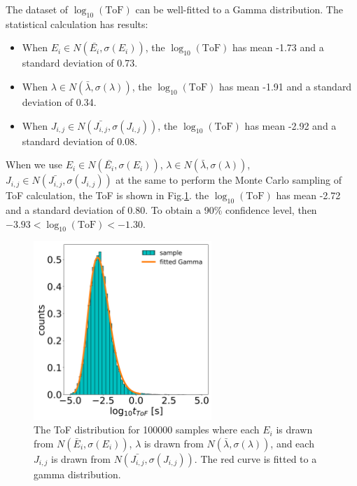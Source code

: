 \documentclass[letterpaper,12pt]{article}
\begin{document}
The dataset of $\log_{10}(\text{ToF})$ can be well-fitted to a Gamma distribution. 
The statistical calculation has results:
\begin{itemize}
    \item When $E_i \in N(\bar{E_i},\sigma(E_i))$, the $\log_{10}(\text{ToF})$ has mean -1.73 and a standard deviation of 0.73.
    \item When $\lambda \in N(\bar{\lambda},\sigma(\lambda))$, the $\log_{10}(\text{ToF})$ has mean -1.91 and a standard deviation of 0.34.
    \item When $J_{i,j} \in N(\bar{J_{i,j}},\sigma(J_{i,j}))$, the $\log_{10}(\text{ToF})$ has mean -2.92 and a standard deviation of 0.08.
\end{itemize}

When we use $E_i \in N(\bar{E_i},\sigma(E_i))$, $\lambda \in N(\bar{\lambda},\sigma(\lambda))$, $J_{i,j} \in N(\bar{J_{i,j}},\sigma(J_{i,j}))$ at the same to perform the Monte Carlo sampling of ToF calculation, the ToF is shown in Fig.\ref{fig:ToFs2}. the $\log_{10}(\text{ToF})$ has mean -2.72 and a standard deviation of 0.80. To obtain a 90\% confidence level, then $-3.93 < \log_{10}(\text{ToF}) < -1.30$.
\begin{figure}
    \centering
    \includegraphics[width=0.6\textwidth]{figs/fig_mle2.png}
    \caption{The ToF distribution for 100000 samples where each $E_i$ is drawn from $N(\bar{E}_i,\sigma(E_i))$, $\lambda$ is drawn from $N(\bar{\lambda},\sigma(\lambda))$, and each $J_{i,j}$ is drawn from $N(\bar{J_{i,j}},\sigma(J_{i,j}))$. The red curve is fitted to a gamma distribution.}
    \label{fig:ToFs2}
\end{figure} 

%
%
\end{document}
